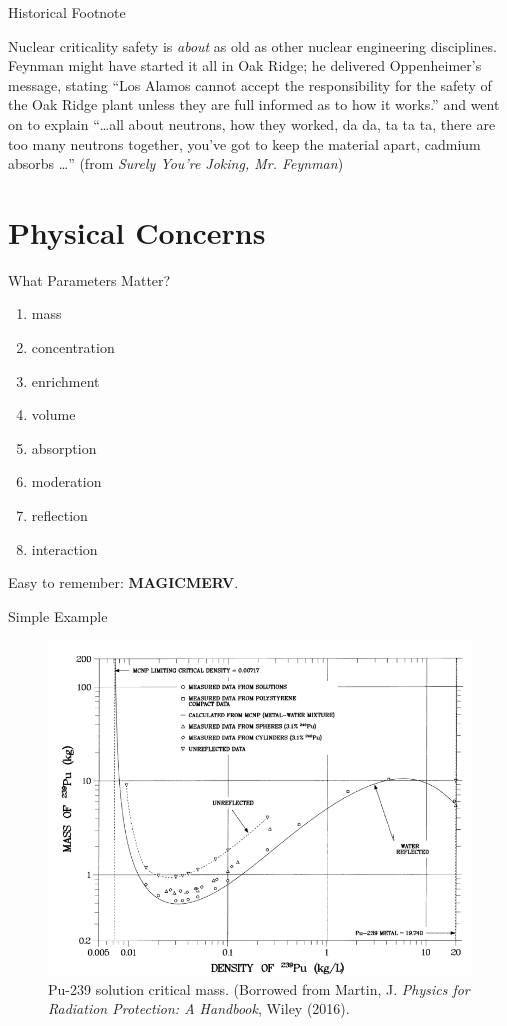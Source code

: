 \documentclass[10pt]{beamer}
\begin{document}
\begin{frame}{Historical Footnote}

Nuclear criticality safety is {\it about} as old as other nuclear engineering
disciplines.  Feynman might have started it all in Oak Ridge; he delivered
Oppenheimer's message, stating
\vfill
\textcolor{mitred}{``Los Alamos cannot accept the responsibility
for the safety of the Oak Ridge plant unless they are full informed as
to how it works.''}
\vfill
and went on to explain
\vfill
\textcolor{mitred}{``\ldots all about neutrons, how they worked, da da, ta ta ta,
there are too many neutrons together, you've got to keep the material
apart, cadmium absorbs \ldots''}
\vfill
(from {\it Surely You're Joking, Mr. Feynman})

\end{frame}


\section{Physical Concerns}

\begin{frame}{What Parameters Matter?}
\pause
\begin{enumerate}
 \item mass
 \item concentration
 \item enrichment
 \item volume
 \item absorption
 \item moderation
 \item reflection
 \item interaction
\end{enumerate}
\vfill Easy to remember: {\bf MAGICMERV}.
\end{frame}

\begin{frame}{Simple Example}
  \begin{figure}
    \includegraphics[keepaspectratio, width = 3.2 in]{images/pu_critical_mass}
    \caption{Pu-239 solution critical mass. (Borrowed from Martin, J. {
             {\it Physics for Radiation Protection: A Handbook}}, Wiley (2016).}
  \end{figure}
\end{frame}
\end{document}
